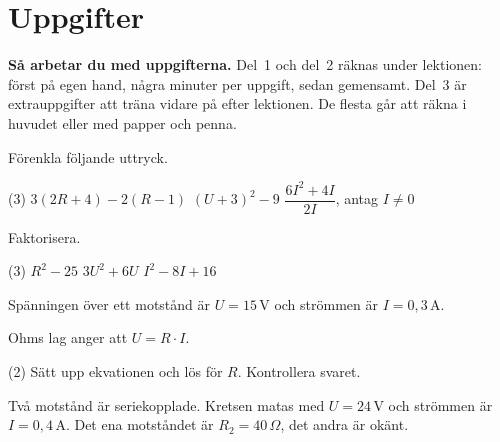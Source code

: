 
\section{Uppgifter}
\label{c3:sec:uppgifter}

\begin{aside}
\textbf{Så arbetar du med uppgifterna.} Del~1 och del~2 räknas under lektionen: först på egen
hand, några minuter per uppgift, sedan gemensamt. Del~3 är extrauppgifter att träna vidare på
efter lektionen. De flesta går att räkna i huvudet eller med papper och penna.

\end{aside}


Förenkla följande uttryck.
\begin{delar}(3)
  \task $3(2R + 4) - 2(R - 1)$
  \task $(U + 3)^2 - 9$
  \task $\dfrac{6I^2 + 4I}{2I}$, antag $I \neq 0$
\end{delar}

Faktorisera.
\begin{delar}(3)
  \task $R^2 - 25$
  \task $3U^2 + 6U$
  \task $I^2 - 8I + 16$
\end{delar}


Spänningen över ett motstånd är $U = 15\,\text{V}$ och strömmen är $I = 0{,}3\,\text{A}$.


Ohms lag anger att $U = R \cdot I$.
\begin{delar}(2)
  \task Sätt upp ekvationen och lös för $R$.
  \task Kontrollera svaret.
\end{delar}

Två motstånd är seriekopplade. Kretsen matas med $U = 24\,\text{V}$ och strömmen är
$I = 0{,}4\,\text{A}$. Det ena motståndet är $R_2 = 40\,\Omega$, det andra är okänt.


